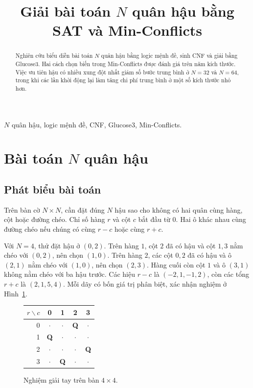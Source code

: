 \documentclass[conference]{IEEEtran}
\title{Giải bài toán $N$ quân hậu bằng SAT và Min-Conflicts}
\author{\IEEEauthorblockN{Đặng Minh Hiếu}
\IEEEauthorblockA{Khoa Công nghệ Thông tin\\Trường Đại học Tôn Đức Thắng}}
\begin{document}
\maketitle
\begin{abstract}
Nghiên cứu biểu diễn bài toán $N$ quân hậu bằng logic mệnh đề,
sinh CNF và giải bằng Glucose3. Hai cách chọn biến trong Min-Conflicts
được đánh giá trên năm kích thước. Việc ưu tiên hậu có nhiều xung đột
nhất giảm số bước trung bình ở $N=32$ và $N=64$, trong khi các lần
khởi động lại làm tăng chi phí trung bình ở một số kích thước nhỏ hơn.
\end{abstract}
\begin{IEEEkeywords}
$N$ quân hậu, logic mệnh đề, CNF, Glucose3, Min-Conflicts.
\end{IEEEkeywords}

\section{Bài toán $N$ quân hậu}

\subsection{Phát biểu bài toán}
Trên bàn cờ $N\times N$, cần đặt đúng $N$ hậu sao cho không có hai
quân cùng hàng, cột hoặc đường chéo. Chỉ số hàng $r$ và cột $c$ bắt
đầu từ $0$. Hai ô khác nhau cùng đường chéo nếu chúng có cùng
$r-c$ hoặc cùng $r+c$.

Với $N=4$, thử đặt hậu ở $(0,2)$. Trên hàng $1$, cột $2$ đã có hậu
và cột $1,3$ nằm chéo với $(0,2)$, nên chọn $(1,0)$. Trên hàng $2$,
các cột $0,2$ đã có hậu và ô $(2,1)$ nằm chéo với $(1,0)$, nên
chọn $(2,3)$. Hàng cuối còn cột $1$ và ô $(3,1)$ không nằm chéo
với ba hậu trước. Các hiệu $r-c$ là $(-2,1,-1,2)$, còn các tổng
$r+c$ là $(2,1,5,4)$. Mỗi dãy có bốn giá trị phân biệt, xác nhận
nghiệm ở Hình~\ref{fig:board}.

\begin{figure}[H]
\centering
\setlength{\tabcolsep}{8pt}
\renewcommand{\arraystretch}{1.1}
\begin{tabular}{r|cccc}
$r\backslash c$ & 0 & 1 & 2 & 3\\ \hline
0 & $\cdot$ & $\cdot$ & \textbf{Q} & $\cdot$\\
1 & \textbf{Q} & $\cdot$ & $\cdot$ & $\cdot$\\
2 & $\cdot$ & $\cdot$ & $\cdot$ & \textbf{Q}\\
3 & $\cdot$ & \textbf{Q} & $\cdot$ & $\cdot$
\end{tabular}
\caption{Nghiệm giải tay trên bàn $4\times4$.}
\label{fig:board}
\end{figure}
\end{document}
